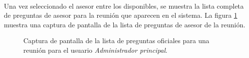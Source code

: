   \paragraph{}Una vez seleccionado el asesor entre los disponibles, se muestra
  la lista completa de preguntas de asesor para la reunión que aparecen en el
  sistema. La figura
  \ref{capturaPantallaListaPreguntasOficialesReunionAdminPrincipal} muestra una
  captura de pantalla de la lista de preguntas de asesor de la reunión.

  \begin{figure}[!ht]
    \begin{center}
      \caption{Captura de pantalla de la lista de preguntas oficiales para una reunión para el usuario \textit{Administrador principal}.}
      \label{capturaPantallaListaPreguntasOficialesReunionAdminPrincipal}
    \end{center}
  \end{figure}
